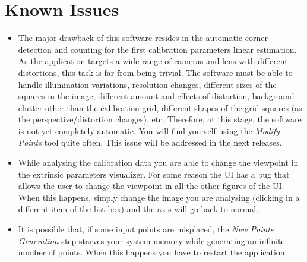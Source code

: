 \documentclass[article,11pt]{memoir}
\begin{document}
%
%
 
\chapter{Known Issues}
\label{sec:knownissues}
\begin{itemize}
\item The major drawback of this software resides in the automatic corner detection and counting for the first calibration parameters linear estimation. As the application targets a wide range of cameras and lens with different distortions, this task is far from being trivial. The software must be able to handle illumination variations, resolution changes, different sizes of the squares in the image, different amount and effects of distortion, background clutter other than the calibration grid, different shapes of the grid squares (as the perspective/distortion changes), etc. Therefore, at this stage, the software is not yet completely automatic. You will find yourself using the \textit{Modify Points} tool quite often. This issue will be addressed in the next releases. 

\item While analysing the calibration data you are able to change the viewpoint in the extrinsic parameters visualizer. For some reason the UI has a bug that allows the user to change the viewpoint in all the other figures of the UI. When this happens, simply change the image you are analysing (clicking in a different item of the list box) and the axis will go back to normal.

\item It is possible that, if some input points are misplaced, the \textit{New Points Generation} step starves your system memory while generating an infinite number of points. When this happens you have to restart the application.
\end{itemize}



 
\end{document}
